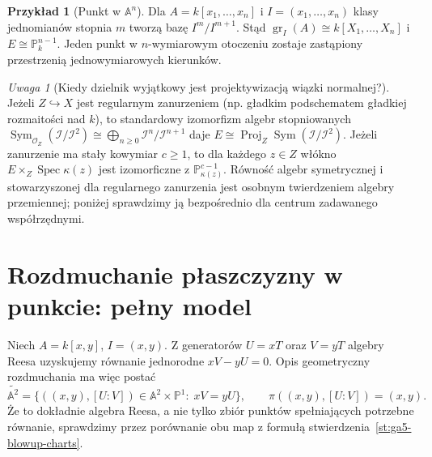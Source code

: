 \documentclass[11pt,a4paper,openany]{report}
\numberwithin{equation}{section}
\theoremstyle{plain}
\theoremstyle{definition}
\newtheorem{przyklad}[twierdzenie]{Przykład}
\theoremstyle{remark}
\newtheorem{uwaga}[twierdzenie]{Uwaga}
\newcommand{\A}{\mathbb A}
\newcommand{\PP}{\mathbb P}
\newcommand{\Spec}{\operatorname{Spec}}
\begin{document}
\begin{przyklad}[Punkt w $\A^n$]
Dla $A=k[x_1,\ldots,x_n]$ i
$I=(x_1,\ldots,x_n)$ klasy jednomianów stopnia $m$
tworzą bazę $I^m/I^{m+1}$. Stąd
$\operatorname{gr}_I(A)\cong k[X_1,\ldots,X_n]$
i $E\cong\PP^{n-1}_k$.
Jeden punkt w $n$-wymiarowym otoczeniu zostaje
zastąpiony przestrzenią jednowymiarowych kierunków.
\end{przyklad}

\begin{uwaga}[Kiedy dzielnik wyjątkowy jest projektywizacją wiązki normalnej?]
Jeżeli $Z\hookrightarrow X$ jest regularnym zanurzeniem
(np. gładkim podschematem gładkiej rozmaitości nad $k$),
to standardowy izomorfizm algebr stopniowanych
$\operatorname{Sym}_{\mathcal O_Z}(\mathcal I/\mathcal I^2)
\cong\bigoplus_{n\ge0}\mathcal I^n/\mathcal I^{n+1}$
daje
$E\cong\operatorname{Proj}_Z
\operatorname{Sym}(\mathcal I/\mathcal I^2)$.
Jeżeli zanurzenie ma stały kowymiar $c\ge1$, to dla każdego
$z\in Z$ włókno $E\times_Z\Spec\kappa(z)$ jest
izomorficzne z $\PP^{c-1}_{\kappa(z)}$. Równość algebr
symetrycznej i stowarzyszonej dla regularnego zanurzenia
jest osobnym twierdzeniem algebry przemiennej;
poniżej sprawdzimy ją bezpośrednio dla centrum
zadawanego współrzędnymi.
\end{uwaga}

\section{Rozdmuchanie płaszczyzny w punkcie: pełny model}
\label{sec:ga5-plane}

Niech $A=k[x,y]$, $I=(x,y)$. Z generatorów
$U=xT$ oraz $V=yT$ algebry Reesa uzyskujemy
równanie jednorodne $xV-yU=0$. Opis geometryczny
rozdmuchania ma więc postać
\[
 \widetilde{\A^2}
 =\{((x,y),[U:V])\in\A^2\times\PP^1:\;xV=yU\},
 \qquad \pi((x,y),[U:V])=(x,y).
\]
Że to dokładnie algebra Reesa, a nie tylko zbiór
punktów spełniających potrzebne równanie, sprawdzimy
przez porównanie obu map z formułą
stwierdzenia~\ref{st:ga5-blowup-charts}.
\end{document}
